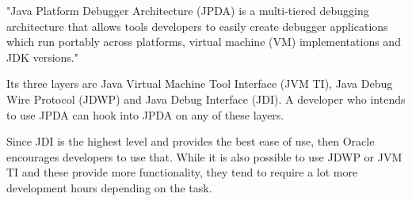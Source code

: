\documentclass[..thesis.tex]{subfiles}
\begin{document}

"Java Platform Debugger Architecture (JPDA) is a multi-tiered debugging architecture that allows tools developers to easily create debugger applications which run portably across platforms, virtual machine (VM) implementations and JDK versions."\cite{oracle_jpda_spec} 

Its three layers are Java Virtual Machine Tool Interface (JVM TI), Java Debug Wire Protocol (JDWP) and Java Debug Interface (JDI). 
A developer who intends to use JPDA can hook into JPDA on any of these layers. \cite{oracle_jpda_spec} 



Since JDI is the highest level and provides the best ease of use, then Oracle encourages developers to use that.\cite{oracle_jpda_spec}
While it is also possible to use JDWP or JVM TI and these provide more functionality, they tend to require a lot more development hours depending on the task. 
\end{document}
